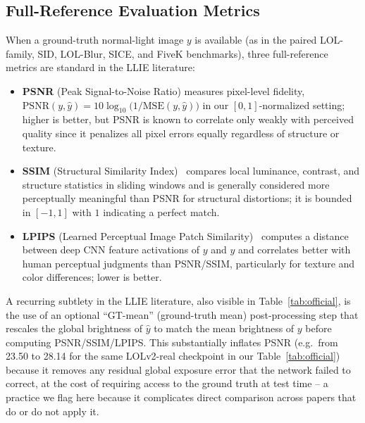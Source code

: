 \documentclass[conference]{IEEEtran}
\begin{document}
\subsection{Full-Reference Evaluation Metrics}
When a ground-truth normal-light image $y$ is available (as in the paired
LOL-family, SID, LOL-Blur, SICE, and FiveK benchmarks), three full-reference
metrics are standard in the LLIE literature:

\begin{itemize}
\item \textbf{PSNR} (Peak Signal-to-Noise Ratio) measures pixel-level
fidelity, $\mathrm{PSNR}(y,\hat y) = 10\log_{10}\!\big(1/\mathrm{MSE}(y,\hat
y)\big)$ in our $[0,1]$-normalized setting; higher is better, but PSNR is
known to correlate only weakly with perceived quality since it penalizes all
pixel errors equally regardless of structure or texture.
\item \textbf{SSIM} (Structural Similarity Index)~\cite{wang2004ssim}
compares local luminance, contrast, and structure statistics in sliding
windows and is generally considered more perceptually meaningful than PSNR
for structural distortions; it is bounded in $[-1,1]$ with $1$ indicating a
perfect match.
\item \textbf{LPIPS} (Learned Perceptual Image Patch Similarity)~\cite{zhang2018lpips}
computes a distance between deep CNN feature activations of $y$ and $\hat
y$ and correlates better with human perceptual judgments than PSNR/SSIM,
particularly for texture and color differences; lower is better.
\end{itemize}
A recurring subtlety in the LLIE literature, also visible in
Table~\ref{tab:official}, is the use of an optional ``GT-mean'' (ground-truth
mean) post-processing step that rescales the global brightness of $\hat y$ to
match the mean brightness of $y$ before computing PSNR/SSIM/LPIPS. This
substantially inflates PSNR (e.g.\ from 23.50 to 28.14 for the same LOLv2-real
checkpoint in our Table~\ref{tab:official}) because it removes any residual
global exposure error that the network failed to correct, at the cost of
requiring access to the ground truth at test time -- a practice we flag here
because it complicates direct comparison across papers that do or do not
apply it.
\end{document}
